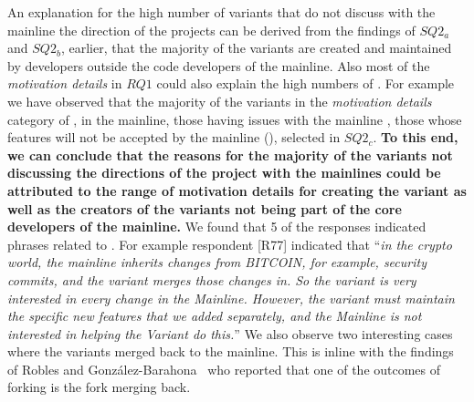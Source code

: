 An explanation for the high number of variants that do not discuss with the mainline the direction of the projects can be derived from the findings of $SQ2_{a}$ and $SQ2_{b}$, earlier, that the majority of the variants are created and maintained by developers outside the code developers of the mainline. Also most of the \emph{motivation details} in $RQ1$ could also explain the high numbers of . For example we have observed that the majority of the variants in the \emph{motivation details} category of ,  in the mainline, those having issues with the mainline , those whose features will not be accepted by the mainline (), selected   in $SQ2_{c}$. \textbf{To this end, we can conclude that the reasons for the majority of the variants not discussing the directions of the project with the mainlines could be attributed to the range of motivation details for creating the variant as well as the creators of the variants not being part of the core developers of the mainline.}
We found that 5 of the responses indicated phrases related to . For example respondent [R77] indicated that ``\emph{in the crypto world, the mainline inherits changes from BITCOIN, for example, security commits, and the variant merges those changes in. So the variant is very interested in every change in the Mainline. However, the variant must maintain the specific new features that we added separately, and the Mainline is not interested in helping the Variant do this.}''
We also observe two interesting cases where the variants merged back to the mainline. This is inline with the findings of Robles and Gonz{\'a}lez-Barahona~\cite{Gregorio:2012} who reported that one of the outcomes of forking is the fork merging back.



